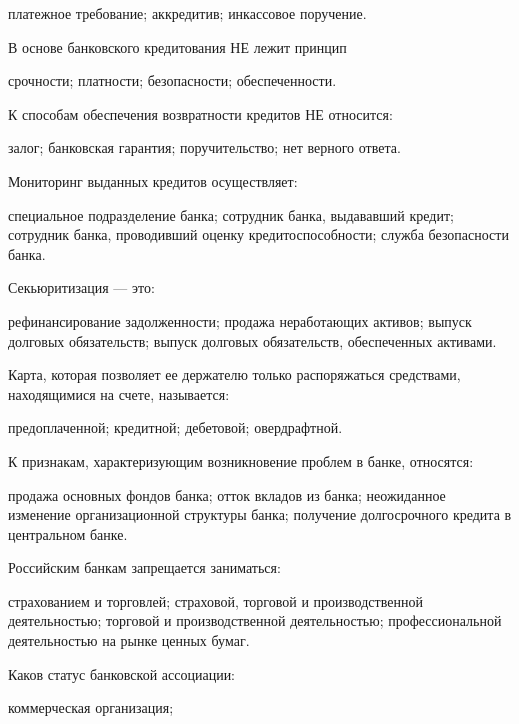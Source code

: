 \documentclass[12pt, table]{exam}
\begin{document}
\begin{questions}
\begin{multicols}{2}
\begin{choices}
	 \choice платежное требование;
	 \choice аккредитив;
	 \choice инкассовое поручение.
	 \end{choices}
\question В основе банковского кредитования НЕ лежит принцип
	 \begin{choices}
	 \choice срочности;
	 \choice платности;
	 \CC безопасности;
	 \choice обеспеченности.
	 \end{choices}
\question К способам обеспечения возвратности кредитов НЕ относится:
	 \begin{choices}
	 \choice залог;
	 \choice банковская гарантия;
	 \choice поручительство;
	 \CC нет верного ответа.
	 \end{choices}
\question Мониторинг выданных кредитов осуществляет:
	 \begin{choices}
	 \choice специальное подразделение банка;
	 \CC сотрудник банка, выдававший кредит;
	 \choice сотрудник банка, проводивший оценку кредитоспособности;
	 \choice служба безопасности банка.
	 \end{choices}
\question Секьюритизация — это:
	 \begin{choices}
	 \choice рефинансирование задолженности;
	 \choice продажа неработающих активов;
	 \choice выпуск долговых обязательств;
	 \CC выпуск долговых обязательств, обеспеченных активами.
	 \end{choices}
\question Карта, которая позволяет ее держателю только распоряжаться средствами, находящимися на счете, называется:
	 \begin{choices}
	 \choice предоплаченной;
	 \choice кредитной;
	 \CC дебетовой;
	 \choice овердрафтной.
	 \end{choices}
\question К признакам, характеризующим возникновение проблем в банке, относятся:
	 \begin{choices}
	 \choice продажа основных фондов банка;
	 \CC отток вкладов из банка;
	 \choice неожиданное изменение организационной структуры банка;
	 \choice получение долгосрочного кредита в центральном банке.
	 \end{choices}
\question Российским банкам запрещается заниматься:
	 \begin{choices}
	 \choice страхованием и торговлей;
	 \CC страховой, торговой и производственной деятельностью;
	 \choice торговой и производственной деятельностью;
	 \choice профессиональной деятельностью на рынке ценных бумаг.
	 \end{choices}
\question Каков статус банковской ассоциации:
	 \begin{choices}
	 \choice коммерческая организация;

\end{choices}
\end{multicols}
\end{questions}
\end{document}
